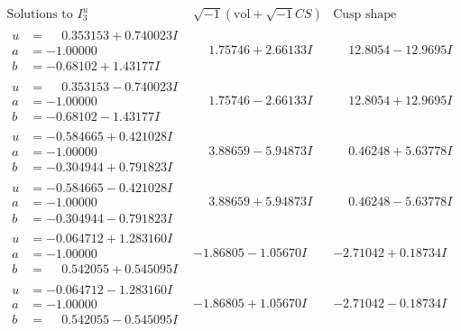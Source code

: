 \documentclass[1p]{elsarticle_modified}
\theoremstyle{definition}
\newcommand{\I}{\sqrt{-1}}
\begin{document}
$$\begin{array}{c|c|c}  
\text{Solutions to }I^u_{3}& \I (\text{vol} + \sqrt{-1}CS) & \text{Cusp shape}\\
 \hline 
\begin{aligned}
u &= \phantom{-}0.353153 + 0.740023 I \\
a &= -1.00000\phantom{ +0.000000I} \\
b &= -0.68102 + 1.43177 I\end{aligned}
 & \phantom{-}1.75746 + 2.66133 I & \phantom{-}12.8054 - 12.9695 I \\ \hline\begin{aligned}
u &= \phantom{-}0.353153 - 0.740023 I \\
a &= -1.00000\phantom{ +0.000000I} \\
b &= -0.68102 - 1.43177 I\end{aligned}
 & \phantom{-}1.75746 - 2.66133 I & \phantom{-}12.8054 + 12.9695 I \\ \hline\begin{aligned}
u &= -0.584665 + 0.421028 I \\
a &= -1.00000\phantom{ +0.000000I} \\
b &= -0.304944 + 0.791823 I\end{aligned}
 & \phantom{-}3.88659 - 5.94873 I & \phantom{-}0.46248 + 5.63778 I \\ \hline\begin{aligned}
u &= -0.584665 - 0.421028 I \\
a &= -1.00000\phantom{ +0.000000I} \\
b &= -0.304944 - 0.791823 I\end{aligned}
 & \phantom{-}3.88659 + 5.94873 I & \phantom{-}0.46248 - 5.63778 I \\ \hline\begin{aligned}
u &= -0.064712 + 1.283160 I \\
a &= -1.00000\phantom{ +0.000000I} \\
b &= \phantom{-}0.542055 + 0.545095 I\end{aligned}
 & -1.86805 - 1.05670 I & -2.71042 + 0.18734 I \\ \hline\begin{aligned}
u &= -0.064712 - 1.283160 I \\
a &= -1.00000\phantom{ +0.000000I} \\
b &= \phantom{-}0.542055 - 0.545095 I\end{aligned}
 & -1.86805 + 1.05670 I & -2.71042 - 0.18734 I \\ \hline\begin{aligned}

\end{aligned}
\end{array}$$
\end{document}
